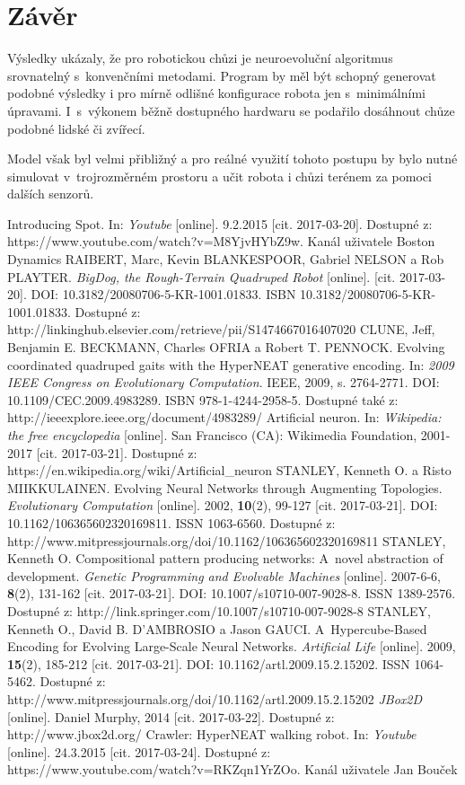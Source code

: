 \documentclass[a4]{article}
\begin{document}
\section{Závěr} 
Výsledky ukázaly, že pro robotickou chůzi je neuroevoluční algoritmus srovnatelný s~konvenčními metodami. Program by měl být schopný generovat podobné výsledky i pro mírně odlišné konfigurace robota jen s~minimálními úpravami. I~s~výkonem běžně dostupného hardwaru se podařilo dosáhnout chůze podobné lidské či zvířecí. \par Model však byl velmi přibližný a pro reálné využití tohoto postupu by bylo nutné simulovat v~trojrozměrném prostoru a učit robota i chůzi terénem za pomoci dalších senzorů.
\begin{thebibliography}{9}
Introducing Spot. In: \textit{Youtube} [online]. 9.2.2015 [cit. 2017-03-20]. Dostupné z: https://www.youtube.com/watch?v=M8YjvHYbZ9w. Kanál uživatele Boston Dynamics
RAIBERT, Marc, Kevin BLANKESPOOR, Gabriel NELSON a Rob PLAYTER. \textit{BigDog, the Rough-Terrain Quadruped Robot} [online]. [cit. 2017-03-20]. DOI: 10.3182/20080706-5-KR-1001.01833. ISBN 10.3182/20080706-5-KR-1001.01833. Dostupné z: http://linkinghub.elsevier.com/retrieve/pii/S1474667016407020
CLUNE, Jeff, Benjamin E. BECKMANN, Charles OFRIA a Robert T. PENNOCK. Evolving coordinated quadruped gaits with the HyperNEAT generative encoding. In: \textit{2009 IEEE Congress on Evolutionary Computation}. IEEE, 2009, s. 2764-2771. DOI: 10.1109/CEC.2009.4983289. ISBN 978-1-4244-2958-5. Dostupné také z: http://ieeexplore.ieee.org/document/4983289/
Artificial neuron. In: \textit{Wikipedia: the free encyclopedia} [online]. San Francisco (CA): Wikimedia Foundation, 2001-2017 [cit. 2017-03-21]. Dostupné z: https://en.wikipedia.org/wiki/Artificial\_neuron
STANLEY, Kenneth O. a Risto MIIKKULAINEN. Evolving Neural Networks through Augmenting Topologies. \emph{Evolutionary Computation} [online]. 2002, \textbf{10}(2), 99-127 [cit. 2017-03-21]. DOI: 10.1162/106365602320169811. ISSN 1063-6560. Dostupné z: http://www.mitpressjournals.org/doi/10.1162/106365602320169811
STANLEY, Kenneth O. Compositional pattern producing networks: A~novel abstraction of development. \emph{Genetic Programming and Evolvable Machines} [online]. 2007-6-6, \textbf{8}(2), 131-162 [cit. 2017-03-21]. DOI: 10.1007/s10710-007-9028-8. ISSN 1389-2576. Dostupné z: http://link.springer.com/10.1007/s10710-007-9028-8
STANLEY, Kenneth O., David B. D'AMBROSIO a Jason GAUCI. A~Hypercube-Based Encoding for Evolving Large-Scale Neural Networks. \textit{Artificial Life} [online]. 2009, \textbf{15}(2), 185-212 [cit. 2017-03-21]. DOI: 10.1162/artl.2009.15.2.15202. ISSN 1064-5462. Dostupné z: http://www.mitpressjournals.org/doi/10.1162/artl.2009.15.2.15202
\textit{JBox2D} [online]. Daniel Murphy, 2014 [cit. 2017-03-22]. Dostupné z: http://www.jbox2d.org/
Crawler: HyperNEAT walking robot. In: \textit{Youtube} [online]. 24.3.2015 [cit. 2017-03-24]. Dostupné z: https://www.youtube.com/watch?v=RKZqn1YrZOo. Kanál uživatele Jan Bouček
\end{thebibliography}
\end{document}
